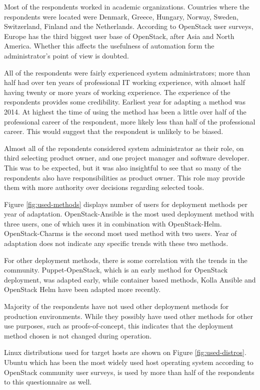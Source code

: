 Most of the respondents worked in academic organizations. Countries where the
respondents were located were Denmark, Greece, Hungary, Norway, Sweden,
Switzerland, Finland and the Netherlands. According to OpenStack user surveys,
Europe has the third biggest user base of OpenStack, after Asia and North
America. Whether this affects the usefulness of automation form the
administrator's point of view is doubted.

All of the respondents were fairly experienced system administrators; more than
half had over ten years of professional IT working experience, with almost
half having twenty or more years of working experience. The experience of the
respondents provides some credibility. Earliest year for adapting a method was
2014. At highest the time of using the method has been a little over half of
the professional career of the respondent, more likely less than half of the
professional career. This would suggest that the respondent is unlikely to be
biased.

Almost all of the repondents considered system administrator as their role, on
third selecting product owner, and one project manager and software developer.
This was to be expected, but it was also insightful to see that so many of the
respondents also have responsibilities as product owner. This role may provide
them with more authority over decisions regarding selected tools.

Figure \ref{fig:used-methods} displays number of users for deployment methods
per year of adaptation. OpenStack-Ansible is the most used deployment method
with three users, one of which uses it in combination with OpenStack-Helm.
OpenStack-Charms is the second most used method with two users. Year of
adaptation does not indicate any specific trends with these two methods.

For other deployment methods, there is some correlation with the trends in the
community. Puppet-OpenStack, which is an early method for OpenStack deployment,
was adapted early, while container based methods, Kolla Ansible and OpenStack
Helm have been adapted more recently.

Majority of the respondents have not used other deployment methods for
production environments. While they possibly have used other methods for other
use purposes, such as proofs-of-concept, this indicates that the deployment
method chosen is not changed during operation.

Linux distributions used for target hosts are shown on Figure
\ref{fig:used-distros}. Ubuntu which has been the most widely used host
operating system according to OpenStack community user surveys, is used by more
than half of the respondents to this questionnaire as well.

